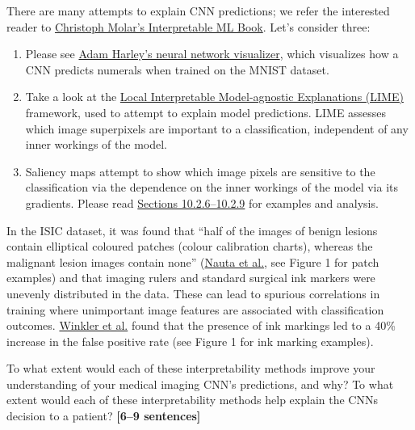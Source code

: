 \documentclass{csci1430}
\begin{document}
\pagebreak
\begin{subquestion}[points=6,drawbox=false]
There are many attempts to explain CNN predictions; we refer the interested reader to \href{https://christophm.github.io/interpretable-ml-book/}{Christoph Molar's Interpretable ML Book}. Let's consider three:

\begin{enumerate}
    \item Please see \href{https://adamharley.com/nn_vis/cnn/2d.html}{Adam Harley's neural network visualizer}, which visualizes how a CNN predicts numerals when trained on the MNIST dataset.
    \item Take a look at the \href{https://christophm.github.io/interpretable-ml-book/lime.html\#example-7}{Local Interpretable Model-agnostic Explanations (LIME)} framework, used to attempt to explain model predictions. LIME assesses which image superpixels are important to a classification, independent of any inner workings of the model.
    \item Saliency maps attempt to show which image pixels are sensitive to the classification via the dependence on the inner workings of the model via its gradients. Please read \href{https://christophm.github.io/interpretable-ml-book/pixel-attribution.html\#examples-6}{Sections 10.2.6--10.2.9} for examples and analysis.
\end{enumerate}

In the ISIC dataset, it was found that ``half of the images of benign lesions contain elliptical coloured patches (colour calibration charts), whereas the malignant lesion images contain none'' (\href{https://www.mdpi.com/2075-4418/12/1/40}{Nauta et al.}, see Figure 1 for patch examples) and that imaging rulers and standard surgical ink markers were unevenly distributed in the data. These can lead to spurious correlations in training where unimportant image features are associated with classification outcomes. \href{https://www.ncbi.nlm.nih.gov/pmc/articles/PMC6694463/}{Winkler et al.} found that the presence of ink markings led to a 40\% increase in the false positive rate (see Figure 1 for ink marking examples).
\end{subquestion}

\pagebreak
\begin{orangebox}
To what extent would each of these interpretability methods improve your understanding of your medical imaging CNN's predictions, and why? To what extent would each of these interpretability methods help explain the CNNs decision to a patient? \textbf{[6--9 sentences]}
\end{orangebox}

\begin{answer}[height=30]

\end{answer}
\pagebreak

\writefeedback

\end{document}
